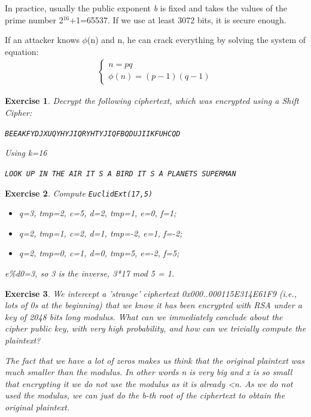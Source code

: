 \documentclass[a4paper, 12pt]{report}
\newtheorem{exercise}{\textbf{Exercise}}
\begin{document}
In practice, usually the public exponent \textit{b} is fixed and takes the values of the prime number 2$^{16}$+1=65537. If we use at least 3072 bits, it is secure enough.

If an attacker knows $\phi$(n) and n, he can crack everything by solving the system of equation:
\begin{align*}
	\begin{cases}
		n = pq\\
		\phi(n) = (p-1)(q-1)
	\end{cases}
\end{align*}

\begin{exercise}
	Decrypt the following ciphertext, which was encrypted using a Shift Cipher:
	\begin{center}
		\texttt{BEEAKFYDJXUQYHYJIQRYHTYJIQFBQDUJIIKFUHCQD}
	\end{center}
	Using k=16
	\begin{center}
		\texttt{LOOK UP IN THE AIR IT S A BIRD IT S A PLANETS SUPERMAN}
	\end{center}
\end{exercise}

\begin{exercise}
	Compute \texttt{EuclidExt(17,5)}
	
	\begin{itemize}
		\item q=3, tmp=2, c=5, d=2, tmp=1, e=0, f=1;
		\item q=2, tmp=1, c=2, d=1, tmp=-2, e=1, f=-2;
		\item q=2, tmp=0, c=1, d=0, tmp=5, e=-2, f=5;
	\end{itemize}
	e\%d0=3, so 3 is the inverse, 3*17 mod 5 = 1.
\end{exercise}

\begin{exercise}
	We intercept a 'strange' ciphertext 0x000..000115E314E61F9 (i.e., lots of 0s at the beginning) that we know it has been encrypted with RSA under a key of 2048 bits long modulus. What can we immediately conclude about the cipher public key, with very high probability, and how can we trivially compute the plaintext?
	
	The fact that we have a lot of zeros makes us think that the original plaintext was much smaller than the modulus. In other words n is very big and x is so small that encrypting it we do not use the modulus as it is already <n. As we do not used the modulus, we can just do the b-th root of the ciphertext to obtain the original plaintext.
\end{exercise}
\end{document}
